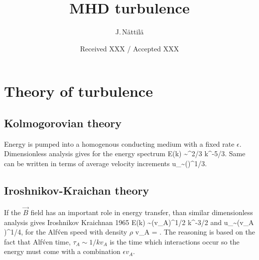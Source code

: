 \documentclass{aa}
\begin{document}
\title{MHD turbulence}

\author{J.\,N\"attil\"a}


\date{Received XXX / Accepted XXX}





\maketitle



\section{Theory of turbulence}\label{sect:theory}

\subsection{Kolmogorovian theory}\label{sect:K41}

Energy is pumped into a homogenous conducting medium with a fixed rate $\epsilon$.
Dimensionless analysis gives for the energy spectrum \citep{Kolmogov_1941}
\be
E(k) \sim \epsilon^{2/3} k^{-5/3}.
\ee
Same can be written in terms of average velocity increments
\be
\delta u_\lambda \sim (\epsilon \lambda)^{1/3}.
\ee

\subsection{Iroshnikov-Kraichan theory}\label{sect:K65}

If the $\vec{B}$ field has an important role in energy transfer, than similar dimensionless analysis gives Iroshnikov Kraichnan 1965
\be
E(k) \sim (\epsilon v_A)^{1/2} k^{-3/2}
\ee
and
\be
\delta u_\lambda \sim (\epsilon v_A \lambda)^{1/4},
\ee
for the Alf\'ven speed with density $\rho$
\be
v_A = .
\ee
The reasoning is based on the fact that Alf\'ven time, $\tau_A \sim 1/k v_A$ is the time which interactions occur so the energy must come with a combination $\epsilon v_A$.
\end{document}

